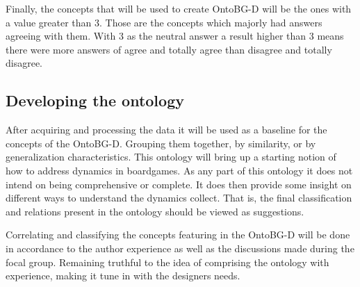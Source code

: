 Finally, the concepts that will be used to create OntoBG-D will be the ones with a value greater than 3. Those are the concepts which majorly had answers agreeing with them. With 3 as the neutral answer a result higher than 3 means there were more answers of agree and totally agree than disagree and totally disagree.

\subsection{Developing the ontology}

After acquiring and processing the data it will be used as a baseline for the concepts of the OntoBG-D. Grouping them together, by similarity, or by generalization characteristics. This ontology will bring up a starting notion of how to address dynamics in boardgames. As any part of this ontology it does not intend on being comprehensive or complete. It does then provide some insight on different ways to understand the dynamics collect. That is, the final classification and relations present in the ontology should be viewed as suggestions.

Correlating and classifying the concepts featuring in the OntoBG-D will be done in accordance to the author experience as well as the discussions made during the focal group. Remaining truthful to the idea of comprising the ontology with experience, making it tune in with the designers needs.